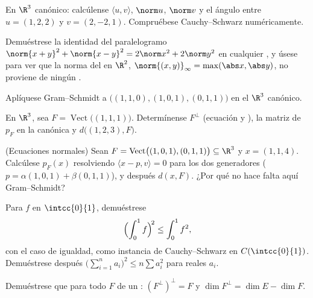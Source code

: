 \begin{exercise}[$\star$]\label{exo:b1:euclid:1}
En $\R^3$ canónico: calcúlense $\langle u, v\rangle$, $\norm u$,
$\norm v$ y el ángulo entre $u = (1, 2, 2)$ y $v = (2, -2, 1)$.
Compruébese Cauchy--Schwarz numéricamente.
\end{exercise}

\begin{exercise}[$\star$]\label{exo:b1:euclid:2}
Demuéstrese la identidad del paralelogramo
$\norm{x+y}^2 + \norm{x-y}^2 = 2\norm x^2 + 2\norm y^2$ en cualquier
, y úsese para ver que la norma del  en
$\R^2$, $\norm{(x,y)}_\infty = \max(\abs x, \abs y)$, no proviene de
ningún .
\end{exercise}

\begin{exercise}[$\star$]\label{exo:b1:euclid:3}
Aplíquese Gram--Schmidt a $\bigl((1,1,0), (1,0,1), (0,1,1)\bigr)$ en
el $\R^3$ canónico.
\end{exercise}

\begin{exercise}[$\star$]\label{exo:b1:euclid:4}
En $\R^3$, sea $F = \operatorname{Vect}\bigl((1,1,1)\bigr)$.
Determínense $F^\perp$ (ecuación y ), la matriz de $p_F$ en la
 canónica y $d\bigl((1, 2, 3), F\bigr)$.
\end{exercise}

\begin{exercise}[$\star\star$]\label{exo:b1:euclid:5}
(Ecuaciones normales) Sean
$F = \operatorname{Vect}\bigl((1,0,1),(0,1,1)\bigr) \subseteq \R^3$
y $x = (1, 1, 4)$. Calcúlese $p_F(x)$ resolviendo
$\langle x - p, v \rangle = 0$ para los dos generadores
($p = \alpha(1,0,1) + \beta(0,1,1)$), y después $d(x, F)$. ¿Por qué
no hace falta aquí Gram--Schmidt?
\end{exercise}

\begin{exercise}[$\star\star$]\label{exo:b1:euclid:6}
Para $f$  en $\intcc{0}{1}$, demuéstrese
\[
\Bigl(\int_0^1 f\Bigr)^{\!2} \leq \int_0^1 f^2 ,
\]
con el caso de igualdad, como instancia de Cauchy--Schwarz en
$C(\intcc{0}{1})$. Demuéstrese después
$\bigl(\sum_{i=1}^n a_i\bigr)^2 \leq n \sum a_i^2$ para reales $a_i$.
\end{exercise}

\begin{exercise}[$\star\star$]\label{exo:b1:euclid:7}
Demuéstrese que para todo  $F$ de un :
$(F^{\perp})^{\perp} = F$ y $\dim F^{\perp} = \dim E - \dim F$.
\end{exercise}

